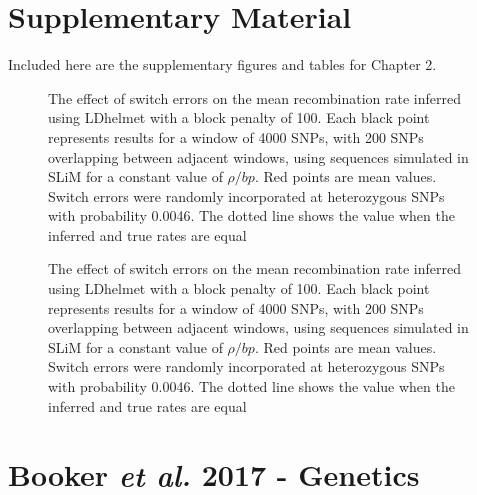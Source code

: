 
\section{Supplementary Material}
Included here are the supplementary figures and tables for Chapter 2.
\linespread{1}




 
 \begin{figure}
   \centering      
   \noindent{}
 \caption[]{}
 \label{fig:1}
\end{figure}

 
 \begin{figure}
   \centering      
   \noindent{}
 \caption[The effect of switch errors on recombination rate inference]{The effect of switch errors on the mean recombination rate inferred using LDhelmet with a block penalty of 100. Each black point represents results for a window of 4000 SNPs, with 200 SNPs overlapping between adjacent windows, using sequences simulated in SLiM for a constant value of $\rho/bp$. Red points are mean values. Switch errors were randomly incorporated at heterozygous SNPs with probability 0.0046. The dotted line shows the value when the inferred and true rates are equal}
 \label{fig:1}
\end{figure}

 
 \begin{figure}
   \centering      
   \noindent{}
 \caption[The effect of switch errors on recombination rate inference]{The effect of switch errors on the mean recombination rate inferred using LDhelmet with a block penalty of 100. Each black point represents results for a window of 4000 SNPs, with 200 SNPs overlapping between adjacent windows, using sequences simulated in SLiM for a constant value of $\rho/bp$. Red points are mean values. Switch errors were randomly incorporated at heterozygous SNPs with probability 0.0046. The dotted line shows the value when the inferred and true rates are equal}
 \label{fig:1}
\end{figure}

\linespread{2}
\pagebreak
\section{Booker \emph{et al.} 2017 - Genetics}
